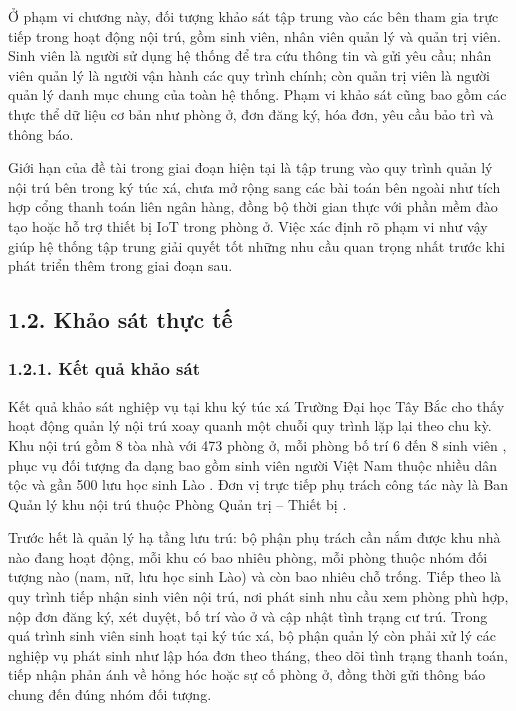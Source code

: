 \documentclass[12pt]{article}
\begin{document}
Ở phạm vi chương này, đối tượng khảo sát tập trung vào các bên tham gia trực tiếp trong hoạt động nội trú, gồm sinh viên, nhân viên quản lý và quản trị viên. Sinh viên là người sử dụng hệ thống để tra cứu thông tin và gửi yêu cầu; nhân viên quản lý là người vận hành các quy trình chính; còn quản trị viên là người quản lý danh mục chung của toàn hệ thống. Phạm vi khảo sát cũng bao gồm các thực thể dữ liệu cơ bản như phòng ở, đơn đăng ký, hóa đơn, yêu cầu bảo trì và thông báo.

Giới hạn của đề tài trong giai đoạn hiện tại là tập trung vào quy trình quản lý nội trú bên trong ký túc xá, chưa mở rộng sang các bài toán bên ngoài như tích hợp cổng thanh toán liên ngân hàng, đồng bộ thời gian thực với phần mềm đào tạo hoặc hỗ trợ thiết bị IoT trong phòng ở. Việc xác định rõ phạm vi như vậy giúp hệ thống tập trung giải quyết tốt những nhu cầu quan trọng nhất trước khi phát triển thêm trong giai đoạn sau.

\subsection*{1.2. Khảo sát thực tế}

\subsubsection*{1.2.1. Kết quả khảo sát}

Kết quả khảo sát nghiệp vụ tại khu ký túc xá Trường Đại học Tây Bắc cho thấy hoạt động quản lý nội trú xoay quanh một chuỗi quy trình lặp lại theo chu kỳ. Khu nội trú gồm 8 tòa nhà với 473 phòng ở, mỗi phòng bố trí 6 đến 8 sinh viên \cite{utb_ktx,utb_phong_ktu}, phục vụ đối tượng đa dạng bao gồm sinh viên người Việt Nam thuộc nhiều dân tộc và gần 500 lưu học sinh Lào \cite{utb_khaigiang2024}. Đơn vị trực tiếp phụ trách công tác này là Ban Quản lý khu nội trú thuộc Phòng Quản trị -- Thiết bị \cite{utb_phongsban}.

Trước hết là quản lý hạ tầng lưu trú: bộ phận phụ trách cần nắm được khu nhà nào đang hoạt động, mỗi khu có bao nhiêu phòng, mỗi phòng thuộc nhóm đối tượng nào (nam, nữ, lưu học sinh Lào) và còn bao nhiêu chỗ trống. Tiếp theo là quy trình tiếp nhận sinh viên nội trú, nơi phát sinh nhu cầu xem phòng phù hợp, nộp đơn đăng ký, xét duyệt, bố trí vào ở và cập nhật tình trạng cư trú. Trong quá trình sinh viên sinh hoạt tại ký túc xá, bộ phận quản lý còn phải xử lý các nghiệp vụ phát sinh như lập hóa đơn theo tháng, theo dõi tình trạng thanh toán, tiếp nhận phản ánh về hỏng hóc hoặc sự cố phòng ở, đồng thời gửi thông báo chung đến đúng nhóm đối tượng.
\end{document}
